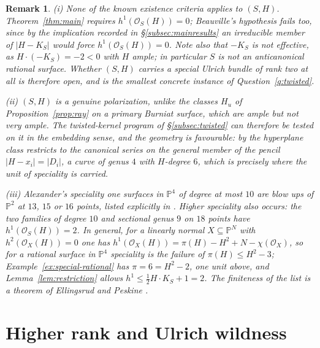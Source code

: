 \documentclass[10pt,a4paper]{amsart}
\newtheorem{remark}[theorem]{Remark}
\newcommand{\OO}{\mathcal{O}}
\newcommand{\PP}{\mathbb{P}}
\begin{document}
\begin{remark}\label{rem:special-rational-context}
(i) None of the known existence criteria applies to $(S,H)$. Theorem~\ref{thm:main} requires $h^1(\OO_S(H))=0$; Beauville's hypothesis fails too, since by the implication recorded in \S\ref{subsec:mainresults} an irreducible member of $|H-K_S|$ would force $h^1(\OO_S(H))=0$. Note also that $-K_S$ is not effective, as $H\cdot(-K_S)=-2<0$ with $H$ ample; in particular $S$ is not an anticanonical rational surface. Whether $(S,H)$ carries a special Ulrich bundle of rank two at all is therefore open, and is the smallest concrete instance of Question~\ref{q:twisted}.

(ii) $(S,H)$ is a genuine polarization, unlike the classes $H_u$ of Proposition~\ref{prop:ray} on a primary Burniat surface, which are ample but not very ample. The twisted-kernel program of \S\ref{subsec:twisted} can therefore be tested on it in the embedding sense, and the geometry is favourable: by \cite[Lem.~III.7, Cor.~III.11]{CH97} the hyperplane class restricts to the \emph{canonical} series on the general member of the pencil $|H-x_i|=|D_i|$, a curve of genus $4$ with $H$-degree $6$, which is precisely where the unit of speciality is carried.

(iii) Alexander's speciality one surfaces in $\PP^4$ of degree at most $10$ are blow ups of $\PP^2$ at $13$, $15$ or $16$ points, listed explicitly in \cite[\S IV]{CH97}. Higher speciality also occurs: the two families of degree $10$ and sectional genus $9$ on $18$ points have $h^1(\OO_S(H))=2$. In general, for a linearly normal $X\subseteq\PP^N$ with $h^2(\OO_X(H))=0$ one has $h^1(\OO_X(H))=\pi(H)-H^2+N-\chi(\OO_X)$, so for a rational surface in $\PP^4$ speciality is the failure of $\pi(H)\le H^2-3$; Example~\ref{ex:special-rational} has $\pi=6=H^2-2$, one unit above, and Lemma~\ref{lem:restriction} allows $h^1\le\tfrac12H\cdot K_S+1=2$. The finiteness of the list is a theorem of Ellingsrud and Peskine \cite{EP89}.
\end{remark}

\section{Higher rank and Ulrich wildness}\label{sec:evenrank}
\end{document}
